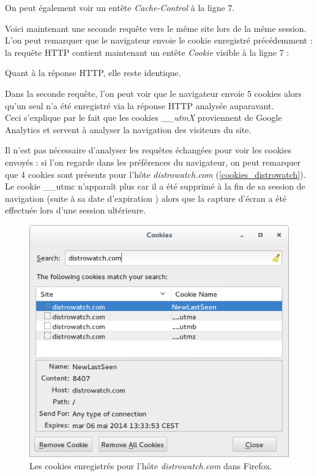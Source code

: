 On peut également voir un entête \textit{Cache-Control} à la ligne 7.
\newline

Voici maintenant une seconde requête vers le même site lors de la même session. L'on peut remarquer que le navigateur envoie le cookie enregistré précédemment : la requête HTTP contient maintenant un entête \textit{Cookie} visible à la ligne 7 :


Quant à la réponse HTTP, elle reste identique.
\newline

Dans la seconde requête, l'on peut voir que le navigateur envoie 5 cookies alors qu'un seul n'a été enregistré via la réponse HTTP analysée auparavant.\\
Ceci s'explique par le fait que les cookies \textit{\_\_utmX} proviennent de Google Analytics \cite{Google_Analytics_cookies} et servent à analyser la navigation des visiteurs du site.
\newline

Il n'est pas nécessaire d'analyser les requêtes échangées pour voir les cookies envoyés : si l'on regarde dans les préférences du navigateur, on peut remarquer que 4 cookies sont présents pour l'hôte \textit{distrowatch.com} (\autoref{cookies_distrowatch}). Le cookie \_\_utmc n'apparaît plus car il a été supprimé à la fin de sa session de navigation (suite à sa date d'expiration \cite{Google_Analytics_cookies}) alors que la capture d'écran a été effectuée lors d'une session ultérieure.

\begin{figure}[h]
	\centering
	\includegraphics[scale=0.75]{figures/cookies_distrowatch.png}
	\caption{\label{cookies_distrowatch}Les cookies enregistrés pour l'hôte \textit{distrowatch.com} dans Firefox.}
\end{figure}


